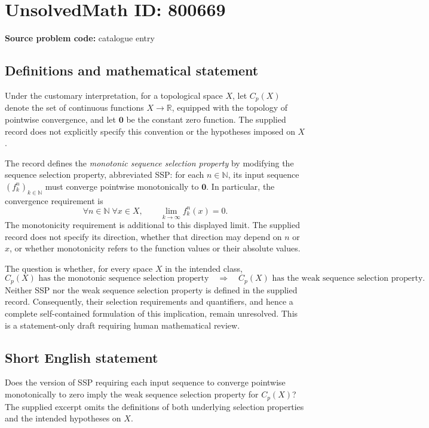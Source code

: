 \documentclass[11pt]{article}
\newcommand{\N}{\mathbb{N}}
\newcommand{\R}{\mathbb{R}}
\begin{document}
\section*{UnsolvedMath ID: 800669}
\textbf{Source problem code:} catalogue entry
\subsection{Definitions and mathematical statement}
Under the customary interpretation, for a topological space \(X\), let \(C_p(X)\) denote the set of continuous functions \(X\to\R\), equipped with the topology of pointwise convergence, and let \(\mathbf{0}\) be the constant zero function. The supplied record does not explicitly specify this convention or the hypotheses imposed on \(X\).

The record defines the \emph{monotonic sequence selection property} by modifying the sequence selection property, abbreviated SSP: for each \(n\in\N\), its input sequence \((f_k^n)_{k\in\N}\) must converge pointwise monotonically to \(\mathbf{0}\). In particular, the convergence requirement is
\[
\forall n\in\N\;\forall x\in X,\qquad \lim_{k\to\infty}f_k^n(x)=0.
\]
The monotonicity requirement is additional to this displayed limit. The supplied record does not specify its direction, whether that direction may depend on \(n\) or \(x\), or whether monotonicity refers to the function values or their absolute values.

The question is whether, for every space \(X\) in the intended class,
\[
C_p(X)\text{ has the monotonic sequence selection property}
\quad\Longrightarrow\quad
C_p(X)\text{ has the weak sequence selection property}.
\]
Neither SSP nor the weak sequence selection property is defined in the supplied record. Consequently, their selection requirements and quantifiers, and hence a complete self-contained formulation of this implication, remain unresolved. This is a statement-only draft requiring human mathematical review.
\subsection{Short English statement}
Does the version of SSP requiring each input sequence to converge pointwise monotonically to zero imply the weak sequence selection property for \(C_p(X)\)? The supplied excerpt omits the definitions of both underlying selection properties and the intended hypotheses on \(X\).
\end{document}
